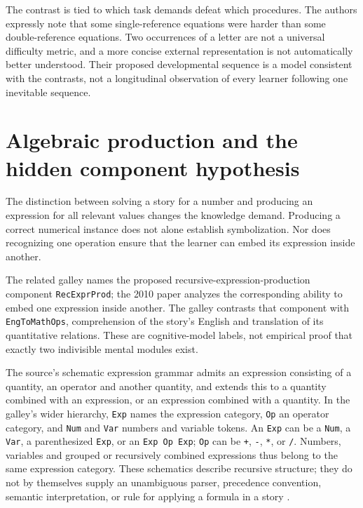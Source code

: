 The contrast is tied to which task demands defeat which procedures.
The authors expressly note that some single-reference equations were
harder than some double-reference equations. Two occurrences of a
letter are not a universal difficulty metric, and a more concise
external representation is not automatically better understood.
Their proposed developmental sequence is a model consistent with the
contrasts, not a longitudinal observation of every learner following
one inevitable sequence.

\section{Algebraic production and the hidden component hypothesis}
\label{sec:p19-cta-production}

The distinction between solving a story for a number and producing an
expression for all relevant values changes the knowledge demand.
Producing a correct numerical instance does not alone establish
symbolization. Nor does recognizing one operation ensure that the
learner can embed its expression inside another.

The related galley names the proposed recursive-expression-production
component \texttt{RecExprProd}; the 2010 paper analyzes the corresponding
ability to embed one expression inside another. The galley contrasts
that component with \texttt{EngToMathOps}, comprehension of the
story's English and translation of its quantitative relations.
These are cognitive-model labels, not empirical proof that exactly
two indivisible mental modules exist.

The source's schematic expression grammar admits an expression
consisting of a quantity, an operator and another quantity, and extends
this to a quantity combined with an expression, or an expression combined
with a quantity. In the galley's wider hierarchy, \texttt{Exp} names
the expression category, \texttt{Op} an operator category, and
\texttt{Num} and \texttt{Var} numbers and variable tokens.
An \texttt{Exp} can be a \texttt{Num}, a \texttt{Var}, a parenthesized
\texttt{Exp}, or an \texttt{Exp Op Exp}; \texttt{Op} can be
\texttt{+}, \texttt{-}, \texttt{*}, or \texttt{/}.
Numbers, variables and grouped or recursively combined expressions
thus belong to the same expression category. These schematics
describe recursive structure; they do not by themselves supply an
unambiguous parser, precedence convention, semantic interpretation,
or rule for applying a formula in a story
\cite[pp.~471--473,Fig.~1]{KoedingerMcLaughlin2010LanguageTransfer}
\cite[galley pp.~707--710,Fig.~40.1]{KoedingerRoll2011TransferTypeset}.

